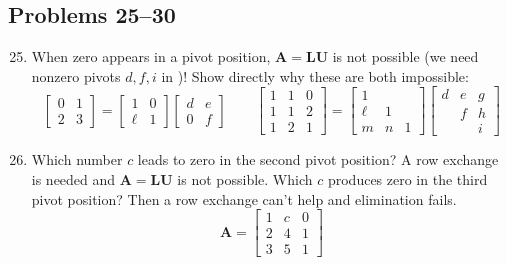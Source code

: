 \begin{itemize}
    \subsection{Problems 25--30}
    \begin{enumerate}\setcounter{enumi}{24}\color{foreground-2}
      \item When zero appears in a pivot position, \(\bm{A} = \bm{LU}\) is not
        possible (we need nonzero pivots \( d,f,i \) in )! Show directly
        why these are both impossible:
        \[%
        \begin{bmatrix}
          0 & 1  \\
          2 & 3
        \end{bmatrix} =
        \begin{bmatrix}
          1 & 0 \\
          \ell & 1
        \end{bmatrix}
        \begin{bmatrix}
          d & e \\
          0 & f
        \end{bmatrix} \qquad
        \begin{bmatrix}
          1 & 1 & 0 \\
          1 & 1 & 2 \\
          1 & 2 & 1
        \end{bmatrix} =
        \begin{bmatrix}
          1 &  &  \\
          \ell & 1 &  \\
          m & n & 1
        \end{bmatrix}
        \begin{bmatrix}
          d & e & g \\
            & f & h  \\
            &  & i
        \end{bmatrix}
        \]%

      \item Which number \(c\) leads to zero in the second pivot position? A row
        exchange is needed and \(\bm{A} = \bm{LU}\) is not possible. Which \(c\)
        produces zero in the third pivot position? Then a  row exchange can't
        help and elimination fails.
        \[%
        \bm{A} = \begin{bmatrix}
        1 & c & 0 \\
        2 & 4 & 1 \\
        3 & 5 & 1
        \end{bmatrix}
        \]%


\end{enumerate}
\end{itemize}
